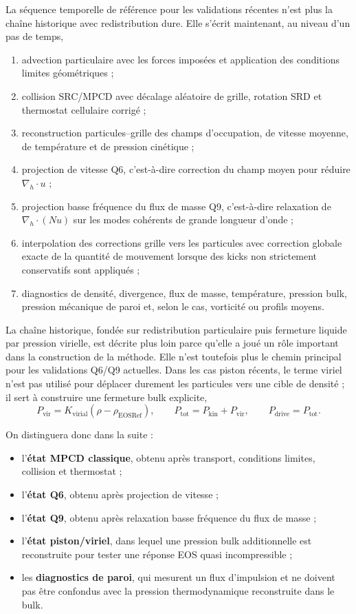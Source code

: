 \documentclass[11pt,a4paper]{article}
\begin{document}
La séquence temporelle de référence pour les validations récentes n'est plus la chaîne historique avec redistribution dure. Elle s'écrit maintenant, au niveau d'un pas de temps,
\begin{enumerate}[label=\arabic*)]
  \item advection particulaire avec les forces imposées et application des conditions limites géométriques ;
  \item collision SRC/MPCD avec décalage aléatoire de grille, rotation SRD et thermostat cellulaire corrigé ;
  \item reconstruction particules--grille des champs d'occupation, de vitesse moyenne, de température et de pression cinétique ;
  \item projection de vitesse Q6, c'est-à-dire correction du champ moyen pour réduire \(\nabla_h\cdot u\) ;
  \item projection basse fréquence du flux de masse Q9, c'est-à-dire relaxation de \(\nabla_h\cdot(Nu)\) sur les modes cohérents de grande longueur d'onde ;
  \item interpolation des corrections grille vers les particules avec correction globale exacte de la quantité de mouvement lorsque des kicks non strictement conservatifs sont appliqués ;
  \item diagnostics de densité, divergence, flux de masse, température, pression bulk, pression mécanique de paroi et, selon le cas, vorticité ou profils moyens.
\end{enumerate}

La chaîne historique, fondée sur redistribution particulaire puis fermeture liquide par pression virielle, est décrite plus loin parce qu'elle a joué un rôle important dans la construction de la méthode. Elle n'est toutefois plus le chemin principal pour les validations Q6/Q9 actuelles. Dans les cas piston récents, le terme viriel n'est pas utilisé pour déplacer durement les particules vers une cible de densité ; il sert à construire une fermeture bulk explicite,
\begin{equation}
  P_{\mathrm{vir}} = K_{\mathrm{virial}}(\rho-\rho_{\mathrm{EOSRef}}),
  \qquad
  P_{\mathrm{tot}}=P_{\mathrm{kin}}+P_{\mathrm{vir}},
  \qquad
  P_{\mathrm{drive}}=P_{\mathrm{tot}}.
\end{equation}

On distinguera donc dans la suite :
\begin{itemize}
  \item l'\textbf{état MPCD classique}, obtenu après transport, conditions limites, collision et thermostat ;
  \item l'\textbf{état Q6}, obtenu après projection de vitesse ;
  \item l'\textbf{état Q9}, obtenu après relaxation basse fréquence du flux de masse ;
  \item l'\textbf{état piston/viriel}, dans lequel une pression bulk additionnelle est reconstruite pour tester une réponse EOS quasi incompressible ;
  \item les \textbf{diagnostics de paroi}, qui mesurent un flux d'impulsion et ne doivent pas être confondus avec la pression thermodynamique reconstruite dans le bulk.
\end{itemize}
\end{document}
